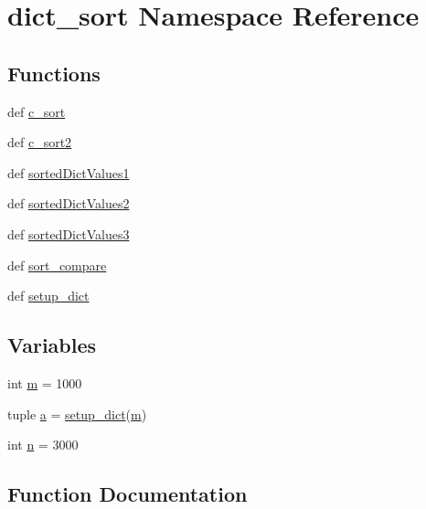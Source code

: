 \hypertarget{namespacedict__sort}{}\section{dict\+\_\+sort Namespace Reference}
\label{namespacedict__sort}
\subsection*{Functions}
\begin{DoxyCompactItemize}
\item 
def \hyperlink{namespacedict__sort_a50528c1e9bdb9584e81825856ff0c2fd}{c\+\_\+sort}
\item 
def \hyperlink{namespacedict__sort_a1a1522246f9522aa4784cfffcfd883ab}{c\+\_\+sort2}
\item 
def \hyperlink{namespacedict__sort_a8b14b750270c74418e427019aae7810d}{sorted\+Dict\+Values1}
\item 
def \hyperlink{namespacedict__sort_ad65f010cf255b8106ec6002bac609505}{sorted\+Dict\+Values2}
\item 
def \hyperlink{namespacedict__sort_ad9ab9badc379aee3533f974d5723d1c4}{sorted\+Dict\+Values3}
\item 
def \hyperlink{namespacedict__sort_a1e64fccf9ad07c5c1a6f35c5e01f0055}{sort\+\_\+compare}
\item 
def \hyperlink{namespacedict__sort_a1cac75aa5f8754b5459188d04bcbcf4c}{setup\+\_\+dict}
\end{DoxyCompactItemize}
\subsection*{Variables}
\begin{DoxyCompactItemize}
\item 
int \hyperlink{namespacedict__sort_a9ecfe0015830f395064d0cfe68a3c5b9}{m} = 1000
\item 
tuple \hyperlink{namespacedict__sort_afb705acf583e2699787e3f20c4721b78}{a} = \hyperlink{namespacedict__sort_a1cac75aa5f8754b5459188d04bcbcf4c}{setup\+\_\+dict}(\hyperlink{namespacedict__sort_a9ecfe0015830f395064d0cfe68a3c5b9}{m})
\item 
int \hyperlink{namespacedict__sort_a7e247f5d70899a343d2a3e70eb430a4c}{n} = 3000
\end{DoxyCompactItemize}


\subsection{Function Documentation}
\hypertarget{namespacedict__sort_a50528c1e9bdb9584e81825856ff0c2fd}{}
